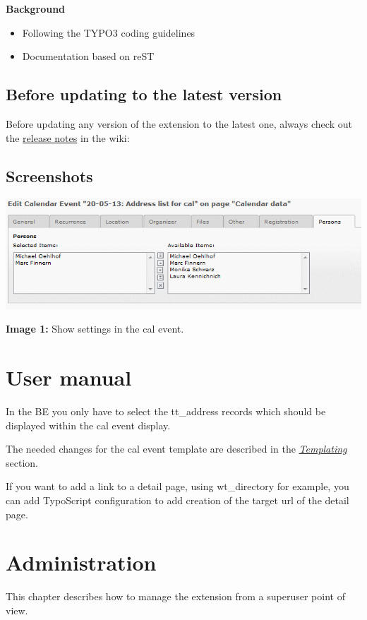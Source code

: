\documentclass[a4paper,10pt,english]{sphinxtypo3manual}
\begin{document}
\textbf{Background}
\begin{itemize}
\item {} 
Following the TYPO3 coding guidelines

\item {} 
Documentation based on reST

\end{itemize}


\section{Before updating to the latest version}
\label{index:before-updating-to-the-latest-version}
Before updating any version of the extension to the latest one, always
check out the \href{http://forge.typo3.org/projects/extension-addresslist4cal/wiki/Release\_Notes}{release notes} in the wiki:


\section{Screenshots}
\label{index:release-notes}\label{index:screenshots}
\includegraphics{manual_html_cal_event.png}

\textbf{Image 1:} Show settings in the cal event.


\chapter{User manual}
\label{index:user-manual}
In the BE you only have to select the tt\_address records which should
be displayed within the cal event display.

The needed changes for the cal event template are described in the
{\hyperref[index:my-templating-label]{\emph{Templating}}} section.

If you want to add a link to a detail page, using wt\_directory for example, you can add TypoScript configuration
to add creation of the target url of the detail page.


\chapter{Administration}
\label{index:administration}
This chapter describes how to manage the extension from a superuser point of view.
\end{document}
